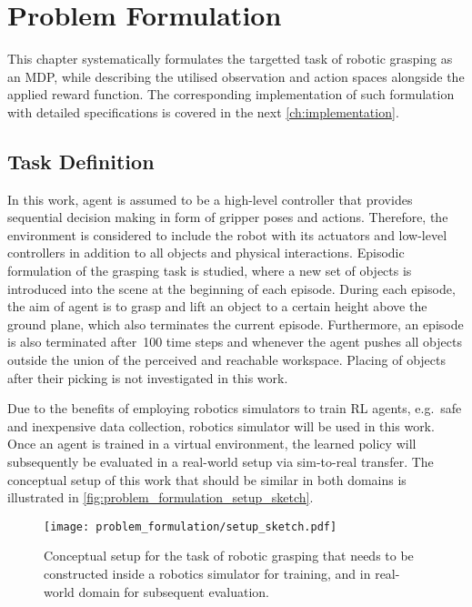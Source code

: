 \chapter{Problem Formulation}\label{ch:problem_formulation}

This chapter systematically formulates the targetted task of robotic grasping as an MDP, while describing the utilised observation and action spaces alongside the applied reward function. The corresponding implementation of such formulation with detailed specifications is covered in the next \autoref{ch:implementation}.

\section{Task Definition}\label{sec:problem_formulation_task_definition}

In this work, agent is assumed to be a high-level controller that provides sequential decision making in form of gripper poses and actions. Therefore, the environment is considered to include the robot with its actuators and low-level controllers in addition to all objects and physical interactions. Episodic formulation of the grasping task is studied, where a new set of objects is introduced into the scene at the beginning of each episode. During each episode, the aim of agent is to grasp and lift an object to a certain height above the ground plane, which also terminates the current episode. Furthermore, an episode is also terminated after~100 time steps and whenever the agent pushes all objects outside the union of the perceived and reachable workspace. Placing of objects after their picking is not investigated in this work.

Due to the benefits of employing robotics simulators to train RL agents, e.g.~safe and inexpensive data collection, robotics simulator will be used in this work. Once an agent is trained in a virtual environment, the learned policy will subsequently be evaluated in a real-world setup via sim-to-real transfer. The conceptual setup of this work that should be similar in both domains is illustrated in \autoref{fig:problem_formulation_setup_sketch}.

\begin{figure}[ht]
    \centering
    \texttt{[image: problem\_formulation/setup\_sketch.pdf]}
    \caption{Conceptual setup for the task of robotic grasping that needs to be constructed inside a robotics simulator for training, and in real-world domain for subsequent evaluation.}
    \label{fig:problem_formulation_setup_sketch}
\end{figure}


